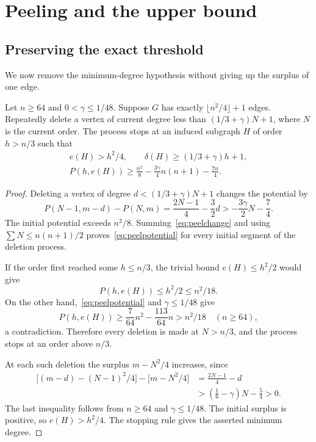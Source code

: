 \section{Peeling and the upper bound}\label{sec:completion}
\subsection{Preserving the exact threshold}
We now remove the minimum-degree hypothesis without giving up the surplus of one edge.

\begin{lemma}\label{lem:peeling}
Let $n\ge64$ and $0<\gamma\le1/48$. Suppose $G$ has exactly $\lfloor n^2/4\rfloor+1$ edges. Repeatedly delete a vertex of current degree less than $(1/3+\gamma)N+1$, where $N$ is the current order. The process stops at an induced subgraph $H$ of order $h>n/3$ such that
\begin{gather}
 e(H)>h^2/4,\qquad \delta(H)\ge(1/3+\gamma)h+1,\label{eq:peelterminal}\\
 P(h,e(H))\ge\frac{n^2}{8}
 -\frac{3\gamma}{4}n(n+1)-\frac{7n}{4}.\label{eq:peelpotential}
\end{gather}
\end{lemma}
\begin{proof}
Deleting a vertex of degree $d<(1/3+\gamma)N+1$ changes the potential by
\begin{equation}\label{eq:peelchange}
 P(N-1,m-d)-P(N,m)
 =\frac{2N-1}{4}-\frac32d
 >-\frac{3\gamma}{2}N-\frac74.
\end{equation}
The initial potential exceeds $n^2/8$. Summing~\eqref{eq:peelchange} and using $\sum N\le n(n+1)/2$ proves~\eqref{eq:peelpotential} for every initial segment of the deletion process.

If the order first reached some $h\le n/3$, the trivial bound $e(H)\le h^2/2$ would give
\[
 P(h,e(H))\le h^2/2\le n^2/18.
\]
On the other hand,~\eqref{eq:peelpotential} and $\gamma\le1/48$ give
\[
 P(h,e(H))\ge\frac{7}{64}n^2-\frac{113}{64}n>n^2/18
 \quad(n\ge64),
\]
a contradiction. Therefore every deletion is made at $N>n/3$, and the process stops at an order above $n/3$.

At each such deletion the surplus $m-N^2/4$ increases, since
\begin{align*}
 \bigl[(m-d)-(N-1)^2/4\bigr]-\bigl[m-N^2/4\bigr]
 &=\frac{2N-1}{4}-d\\
 &>\left(\frac16-\gamma\right)N-\frac54>0.
\end{align*}
The last inequality follows from $n\ge64$ and $\gamma\le1/48$. The initial surplus is positive, so $e(H)>h^2/4$. The stopping rule gives the asserted minimum degree.
\end{proof}

